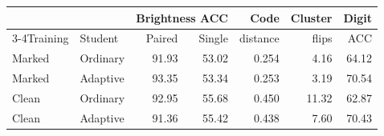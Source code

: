 \begin{tabular}{llrrrrr}\toprule
& & \multicolumn{2}{c}{Brightness ACC} & Code & Cluster & Digit\\
\cmidrule(lr){3-4}Training & Student & Paired & Single & distance & flips & ACC\\\midrule
Marked & Ordinary & 91.93 & 53.02 & 0.254 & 4.16 & 64.12\\
Marked & Adaptive & 93.35 & 53.34 & 0.253 & 3.19 & 70.54\\
Clean & Ordinary & 92.95 & 55.68 & 0.450 & 11.32 & 62.87\\
Clean & Adaptive & 91.36 & 55.42 & 0.438 & 7.60 & 70.43\\
\bottomrule\end{tabular}
